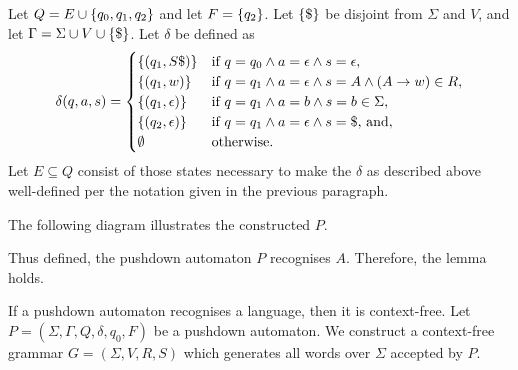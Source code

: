    Let \(Q = E \cup \{q_0, q_1, q_2\}\) and let \(F = \{q_2\}\). Let
    \(\{\$\}\) be disjoint from \(\Sigma\) and \(V\), and let \(\Gamma =
    \Sigma \cup V \cup \{\$\}\). Let \(\delta\) be defined as
    \[
        \delta(q, a, s) = \begin{cases}
            \{(q_1, S \$)\} & \text{if } q = q_0 \land a = \epsilon \land s =
            \epsilon,\\
            \{(q_1, w)\} & \text{if } q = q_1 \land a = \epsilon \land s = A
            \land (A \to w) \in R,\\
            \{(q_1, \epsilon)\} & \text{if } q = q_1 \land a = b \land s = b
            \in \Sigma,\\
            \{(q_2, \epsilon)\} & \text{if } q = q_1 \land a = \epsilon \land
            s = \$\text{, and},\\
            \emptyset & \text{otherwise.}
        \end{cases}
    \]
    Let \(E \subseteq Q\) consist of those states necessary to make the
    \(\delta\) as described above well-defined per the notation given in the
    previous paragraph.

    The following diagram illustrates the constructed \(P\).
    \begin{figure}[!h]
        \centering
    \end{figure}

    Thus defined, the pushdown automaton \(P\) recognises \(A\). Therefore, the
    lemma holds.
\Epr

\Blm
    \label{lem4}
    If a pushdown automaton recognises a language, then it is context-free.
\Elm
\Bpr
    Let \(P = (\Sigma, \Gamma, Q, \delta, q_0, F)\) be a pushdown automaton. We
    construct a context-free grammar \(G = (\Sigma, V, R, S)\) which generates
    all words over \(\Sigma\) accepted by \(P\).

